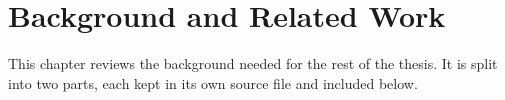 \chapter{Background and Related Work}
\label{ch:background}


This chapter reviews the background needed for the rest of the thesis. It is
split into two parts, each kept in its own source file and included below.



